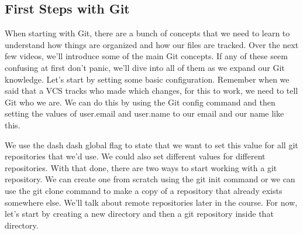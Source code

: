 	\subsection{First Steps with Git}
	
	
	When starting with Git, there are a bunch of concepts that we need to learn to understand how things are organized and how our files are tracked. Over the next few videos, we'll introduce some of the main Git concepts. If any of these seem confusing at first don't panic, we'll dive into all of them as we expand our Git knowledge. Let's start by setting some basic configuration. Remember when we said that a VCS tracks who made which changes, for this to work, we need to tell Git who we are. We can do this by using the Git config command and then setting the values of user.email and user.name to our email and our name like this.
	
	We use the dash dash global flag to state that we want to set this value for all git repositories that we'd use. We could also set different values for different repositories. With that done, there are two ways to start working with a git repository. We can create one from scratch using the git init command or we can use the git clone command to make a copy of a repository that already exists somewhere else. We'll talk about remote repositories later in the course. For now, let's start by creating a new directory and then a git repository inside that directory.
	
